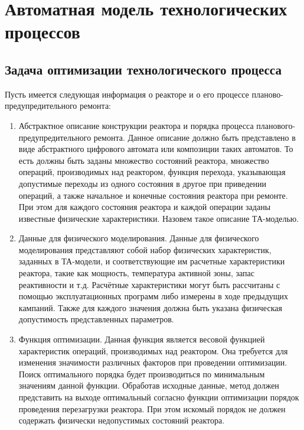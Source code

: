 \chapter{Автоматная модель технологических процессов}

\section{Задача оптимизации технологического процесса}

Пусть имеется следующая информация о реакторе и о его процессе планово-предупредительного ремонта:
\begin{enumerate}
\item Абстрактное описание конструкции реактора и порядка процесса планового-предупредительного ремонта. Данное описание должно быть представлено в виде абстрактного цифрового автомата или композиции таких автоматов. То есть должны быть заданы множество состояний реактора, множество операций, производимых над реактором, функция перехода, указывающая допустимые переходы из одного состояния в другое при приведении операций, а также начальное и конечные состояния реактора  при ремонте. При этом для каждого состояния реактора и каждой операции заданы известные физические характеристики. Назовем такое описание ТА-моделью.
\item Данные для физического моделирования. Данные для физического моделирования представляют собой набор физических характеристик, заданных в ТА-модели, и соответствующие им расчетные характеристики реактора, такие как мощность, температура активной зоны, запас реактивности и т.д. Расчётные характеристики могут быть рассчитаны с помощью эксплуатационных программ либо измерены в ходе предыдущих кампаний. Также для каждого значения должна быть указана физическая допустимость представленных параметров.
\item Функция оптимизации. Данная функция является весовой функцией характеристик операций, производимых над реактором. Она требуется для изменения значимости различных факторов при проведении оптимизации. Поиск оптимального порядка будет производиться по минимальным значениям данной функции.
Обработав исходные данные, метод должен представить на выходе оптимальный согласно функции оптимизации порядок проведения перезагрузки реактора. При этом искомый порядок не должен содержать физически недопустимых состояний реактора.
\end{enumerate}

